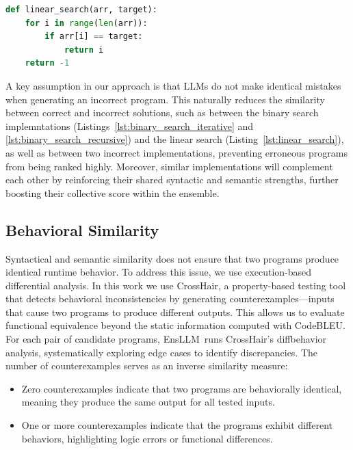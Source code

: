 \documentclass{article}
\newcommand{\tool}{EnsLLM}
\begin{document}
\begin{lstlisting}[language=Python, caption={Linear Search Implementation (Incorrect, as the task requires a Binary Search algorithm)}, label={lst:linear_search}]
def linear_search(arr, target):
    for i in range(len(arr)):
        if arr[i] == target:
            return i
    return -1
\end{lstlisting}


A key assumption in our approach is that LLMs do not make identical mistakes when generating an incorrect program. This naturally reduces the similarity between correct and incorrect solutions, such as between the binary search implemntations (Listings~\ref{lst:binary_search_iterative} and \ref{lst:binary_search_recursive}) and the linear search (Listing~\ref{lst:linear_search}), as well as between two incorrect implementations, preventing erroneous programs from being ranked highly. Moreover, similar implementations
will complement each other by reinforcing their shared syntactic and semantic strengths, further boosting their collective score within the ensemble. 

\subsection{Behavioral Similarity}
Syntactical and semantic similarity does not ensure that two programs produce identical runtime behavior. To address this issue, we use execution-based differential analysis. In this work we use CrossHair, a property-based testing tool that detects behavioral inconsistencies by generating counterexamples—inputs that cause two programs to produce different outputs. This allows us to evaluate functional equivalence beyond the static information computed with CodeBLEU.
For each pair of candidate programs, \tool\ runs CrossHair's diffbehavior analysis, systematically exploring edge cases to identify discrepancies. The number of counterexamples serves as an inverse similarity measure:

\begin{itemize}
    \item Zero counterexamples indicate that two programs are behaviorally identical, meaning they produce the same output for all tested inputs.
    \item One or more counterexamples indicate that the programs exhibit different behaviors, highlighting logic errors or functional differences.
\end{itemize}
\end{document}
